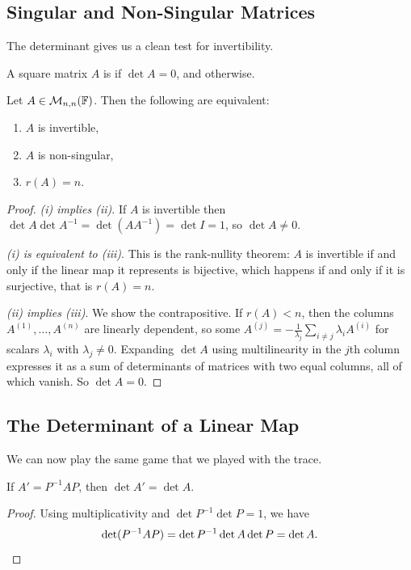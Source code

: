 \documentclass[a4paper]{scrartcl}
\begin{document}
\subsection{Singular and Non-Singular Matrices}

The determinant gives us a clean test for invertibility.

\begin{definition}
    A square matrix $A$ is  if $\det A = 0$, and  otherwise.
\end{definition}

\begin{theorem}
    Let $A \in \mathcal{M}_{n,n}(\mathbb{F})$. Then the following are equivalent:
    \begin{enumerate}[label=(\roman*)]
        \item $A$ is invertible,
        \item $A$ is non-singular,
        \item $r(A) = n$.
    \end{enumerate}
\end{theorem}
\begin{proof}
    \emph{(i) implies (ii)}. If $A$ is invertible then $\det A \det A^{-1} = \det (AA^{-1}) = \det I = 1$, so $\det A \neq 0$.

    \emph{(i) is equivalent to (iii)}. This is the rank-nullity theorem: $A$ is invertible if and only if the linear map it represents is bijective, which happens if and only if it is surjective, that is $r(A) = n$.

    \emph{(ii) implies (iii)}. We show the contrapositive. If $r(A) < n$, then the columns $A^{(1)}, \dots, A^{(n)}$ are linearly dependent, so some $A^{(j)} = -\frac{1}{\lambda_j}\sum_{i \neq j} \lambda_i A^{(i)}$ for scalars $\lambda_i$ with $\lambda_j \neq 0$. Expanding $\det A$ using multilinearity in the $j$th column expresses it as a sum of determinants of matrices with two equal columns, all of which vanish. So $\det A = 0$.
\end{proof}

\subsection{The Determinant of a Linear Map}

We can now play the same game that we played with the trace.

\begin{lemma}
    If $A' = P^{-1} A P$, then $\det A' = \det A$.
\end{lemma}
\begin{proof}
    Using multiplicativity and $\det P^{-1}\det P = 1$, we have
    $$
    \det (P^{-1}AP) = \det P^{-1} \det A \det P = \det A. \qedhere
    $$
\end{proof}
\end{document}
